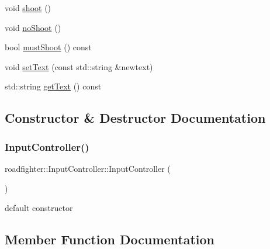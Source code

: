 \begin{DoxyCompactItemize}
void \hyperlink{classroadfighter_1_1InputController_a63ba4cb79605531878f2e12f5564194a}{shoot} ()
\item 
void \hyperlink{classroadfighter_1_1InputController_a0bc4209941f91c548673f85905fb3ead}{no\+Shoot} ()
\item 
bool \hyperlink{classroadfighter_1_1InputController_aba6e5f98ed035840c5319b17c3291046}{must\+Shoot} () const
\item 
void \hyperlink{classroadfighter_1_1InputController_a962ec0e6e8247ca42db314c04ce65399}{set\+Text} (const std\+::string \&newtext)
\item 
std\+::string \hyperlink{classroadfighter_1_1InputController_ae8e47099a39fd61e18cdd89b34fb5d5c}{get\+Text} () const
\end{DoxyCompactItemize}


\subsection{Constructor \& Destructor Documentation}
\mbox{\label{classroadfighter_1_1InputController_ae1647309708d4053f7f993452436c6de}} 
\subsubsection{\texorpdfstring{Input\+Controller()}{InputController()}}
{\footnotesize\ttfamily roadfighter\+::\+Input\+Controller\+::\+Input\+Controller (\begin{DoxyParamCaption}{ }\end{DoxyParamCaption})\hspace{0.3cm}{\ttfamily [default]}}

default constructor 

\subsection{Member Function Documentation}
\mbox{\label{classroadfighter_1_1InputController_a8b8656f81620db2af82d5bf9ca60fac0}} 
